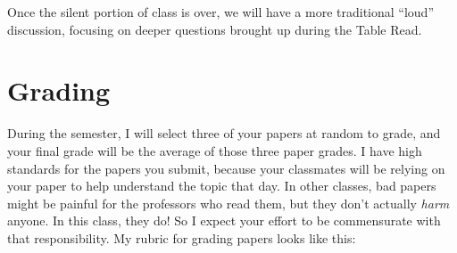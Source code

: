\documentclass[11pt, letterpaper]{article}
\begin{document}
Once the silent portion of class is over, we will have a more traditional ``loud'' discussion, focusing on deeper questions brought up during the Table Read.

%
%
%

\section*{Grading}

During the semester, I will select three of your papers at random to grade, and your final grade will be the average of those three paper grades. I have high standards for the papers you submit, because your classmates will be relying on your paper to help understand the topic that day. In other classes, bad papers might be painful for the professors who read them, but they don't actually \textit{harm} anyone. In this class, they do! So I expect your effort to be commensurate with that responsibility. My rubric for grading papers looks like this:
\end{document}
